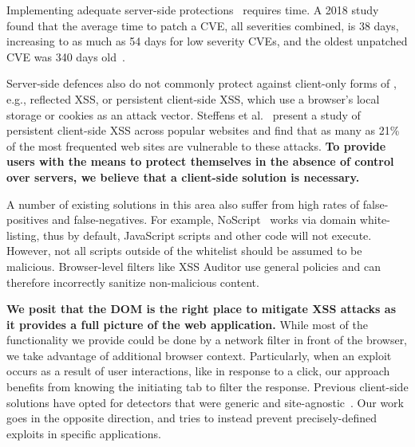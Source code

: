 Implementing adequate server-side protections~\cite{Xu:2006:TPE:1267336.1267345,DBLP:conf/sec/Nguyen-TuongGGSE05,Pietraszek:2005:DAI:2146257.2146267,Bisht:2008:XPD:1428322.1428325} requires time.
A 2018 study found that the average time to patch a \ac{CVE}, all severities combined, is 38 days, increasing to as much as 54 days for low severity CVEs, and the oldest unpatched \ac{CVE} was 340 days old~\cite{Rapid7}.



Server-side defences also do not commonly protect against client-only forms of
\xss, e.g., reflected \ac{XSS}, or persistent
client-side \ac{XSS}, which use a browser's local storage or cookies
as an attack vector. Steffens et
al.~\cite{DBLP:conf/ndss/SteffensRJS19} present a study of persistent
client-side \ac{XSS} across popular websites and find that as many as
21\% of the most frequented web sites are vulnerable to these attacks.
%
\textbf{To provide users with the means to protect themselves in the absence
of control over servers, we believe that a client-side
solution is necessary.}

A number of existing solutions in this area also suffer from high
rates of false-positives and false-negatives. %
For example, NoScript~\cite{Noscript} works via domain white-listing, thus by
default, JavaScript scripts and other code will not execute. However,
not all scripts outside of the whitelist should be assumed to be
malicious. Browser-level filters like XSS Auditor use
general policies and can therefore incorrectly sanitize non-malicious
content.

\textbf{We posit that the DOM is the right place to mitigate XSS
  attacks as it provides a full picture of the web application.} While
most of the functionality we provide could be done by a network filter
in front of the browser, we take advantage of additional browser context.
%
Particularly, when an exploit occurs as a result of user interactions,
like in response to a click, our approach
benefits from knowing the initiating tab to filter the
response. Previous client-side solutions have opted for detectors that were generic and site-agnostic~\cite{Kirda:2009:CCS:2639535.2639808,Jim:2007:DSI:1242572.1242654,Hallaraker:2005:DMJ:1078029.1078861}. Our work goes in the opposite direction, and tries to instead prevent precisely-defined exploits in specific applications. 


